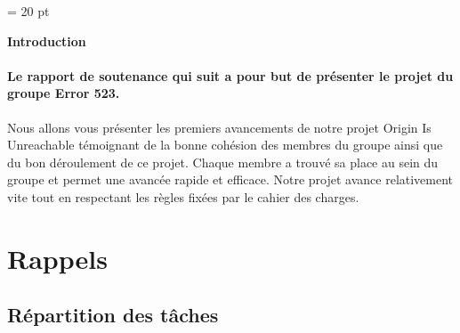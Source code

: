 \documentclass[12pt,a4paper]{article}
\begin{document}
\pagestyle{fancy}
\thispagestyle{empty}
\baselineskip = 20 pt
\newpage
{}

\begin{center}
\begin{Large}
\textbf{Introduction}
\end{Large}
\end{center}

  	\paragraph{		 Le rapport de soutenance qui suit a pour but de présenter le projet du groupe
Error 523.\newline} 

	Nous allons vous présenter les premiers avancements de notre projet Origin Is Unreachable témoignant de la bonne cohésion des membres du groupe ainsi que du bon déroulement de ce projet. Chaque membre a trouvé sa place au sein du groupe et permet une avancée rapide et efficace. Notre projet avance relativement vite tout en respectant les règles fixées par le cahier des charges. 
\newpage
\thispagestyle{empty}
\tableofcontents

\newpage
\section {Rappels}
\subsection{Répartition des tâches}
\end{document}
